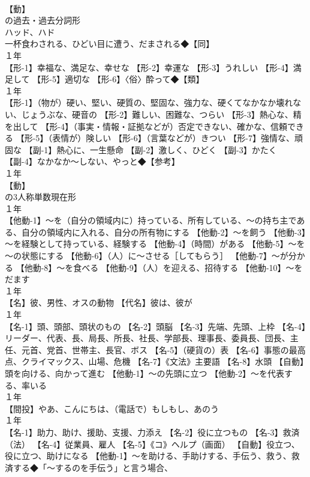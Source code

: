 \documentclass[8pt]{extreport}
\begin{document}
\begin{CJK}{UTF8}{min}
\\	【動】
\\	の過去・過去分詞形 
\\	ハッド、ハド 
\\	一杯食わされる、ひどい目に遭う、だまされる◆【同】
\\	１年	
\\	【形-1】幸福な、満足な、幸せな 【形-2】幸運な 【形-3】うれしい 【形-4】満足して 【形-5】適切な 【形-6】〈俗〉酔って◆【類】
\\	１年	
\\	【形-1】（物が）硬い、堅い、硬質の、堅固な、強力な、硬くてなかなか壊れない、じょうぶな、硬音の 【形-2】難しい、困難な、つらい 【形-3】熱心な、精を出して 【形-4】（事実・情報・証拠などが）否定できない、確かな、信頼できる 【形-5】（表情が）険しい 【形-6】（言葉などが）きつい 【形-7】強情な、頑固な 【副-1】熱心に、一生懸命 【副-2】激しく、ひどく 【副-3】かたく 【副-4】なかなか～しない、やっと◆【参考】
\\	１年	
\\	【動】
\\	の3人称単数現在形
\\	１年	
\\	【他動-1】～を（自分の領域内に）持っている、所有している、～の持ち主である、自分の領域内に入れる、自分の所有物にする 【他動-2】～を飼う 【他動-3】～を経験として持っている、経験する 【他動-4】（時間）がある 【他動-5】～を～の状態にする 【他動-6】（人）に～させる［してもらう］ 【他動-7】～が分かる 【他動-8】～を食べる 【他動-9】（人）を迎える、招待する 【他動-10】～をだます
\\	１年	
\\	【名】彼、男性、オスの動物 【代名】彼は、彼が
\\	１年	
\\	【名-1】頭、頭部、頭状のもの 【名-2】頭脳 【名-3】先端、先頭、上枠 【名-4】リーダー、代表、長、局長、所長、社長、学部長、理事長、委員長、団長、主任、元首、党首、世帯主、長官、ボス 【名-5】（硬貨の）表 【名-6】事態の最高点、クライマックス、山場、危機 【名-7】《文法》主要語 【名-8】水頭 【自動】頭を向ける、向かって進む 【他動-1】～の先頭に立つ 【他動-2】～を代表する、率いる
\\	１年	
\\	【間投】やあ、こんにちは、（電話で）もしもし、あのう
\\	１年	
\\	【名-1】助力、助け、援助、支援、力添え 【名-2】役に立つもの 【名-3】救済（法） 【名-4】従業員、雇人 【名-5】《コ》ヘルプ（画面） 【自動】役立つ、役に立つ、助けになる 【他動-1】～を助ける、手助けする、手伝う、救う、救済する◆「～するのを手伝う」と言う場合、

\end{CJK}
\end{document}
